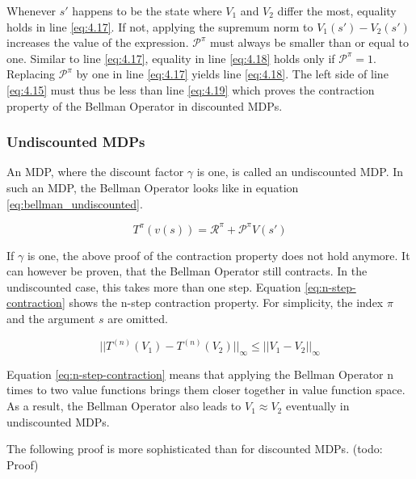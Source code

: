 Whenever $s'$ happens to be the state where $V_1$ and $V_2$ differ the most, equality holds in line \ref{eq:4.17}. If not, applying the supremum norm to $V_1(s')-V_2(s')$ increases the value of the expression. $\mathcal{P}^\pi$ must always be smaller than or equal to one. Similar to line \ref{eq:4.17}, equality in line \ref{eq:4.18} holds only if $\mathcal{P}^\pi=1$. Replacing $\mathcal{P}^\pi$ by one in line \ref{eq:4.17} yields line \ref{eq:4.18}. The left side of line \ref{eq:4.15} must thus be less than line \ref{eq:4.19} which proves the contraction property of the Bellman Operator in discounted MDPs.

\subsubsection{Undiscounted MDPs}

An MDP, where the discount factor $\gamma$ is one, is called an undiscounted MDP. In such an MDP, the Bellman Operator looks like in equation \ref{eq:bellman_undiscounted}.

\begin{equation}
T^\pi(v(s))=\mathcal{R}^\pi + \mathcal{P}^\pi V(s')
\label{eq:bellman_undiscounted}
\end{equation}

If $\gamma$ is one, the above proof of the contraction property does not hold anymore. It can however be proven, that the Bellman Operator still contracts. In the undiscounted case, this takes more than one step. Equation \ref{eq:n-step-contraction} shows the n-step contraction property. For simplicity, the index $\pi$ and the argument $s$ are omitted.

\begin{equation}
||T^{(n)}(V_1)-T^{(n)}(V_2)||_\infty \leq ||V_1-V_2||_\infty
\label{eq:n-step-contraction}
\end{equation}

Equation \ref{eq:n-step-contraction} means that applying the Bellman Operator n times to two value functions brings them closer together in value function space. As a result, the Bellman Operator also leads to $V_1 \approx V_2$ eventually in undiscounted MDPs.

The following proof is more sophisticated than for discounted MDPs. 
(todo: Proof)

